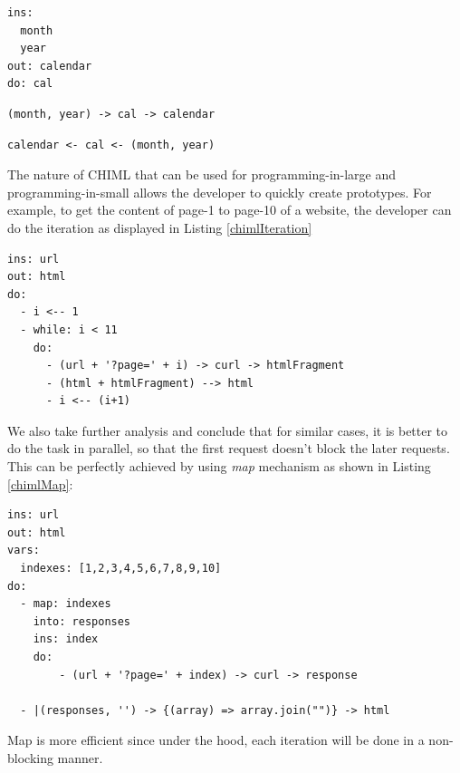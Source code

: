 \documentclass[conference]{IEEEtran}
\begin{document}
\begin{lstlisting}[caption=CHIML Program Example, label=chimlLongExample, basicstyle=\footnotesize, breaklines=true]
ins:
  month
  year
out: calendar
do: cal
\end{lstlisting}

\begin{lstlisting}[caption=CHIML Program Example (Short), label=chimlShortExample, basicstyle=\footnotesize, breaklines=true]
(month, year) -> cal -> calendar
\end{lstlisting}

\begin{lstlisting}[caption=CHIML Program Example (Short-Reversed), label=chimlReversedExample, basicstyle=\footnotesize, breaklines=true]
calendar <- cal <- (month, year)
\end{lstlisting}

The nature of CHIML that can be used for programming-in-large and programming-in-small allows the developer to quickly create prototypes. For example, to get the content of page-1 to page-10 of a website, the developer can do the iteration as displayed in Listing \ref{chimlIteration}

\begin{lstlisting}[caption=CHIML Iteration, label=chimlIteration, basicstyle=\footnotesize, breaklines=true]
ins: url
out: html
do:
  - i <-- 1
  - while: i < 11
    do:
      - (url + '?page=' + i) -> curl -> htmlFragment
      - (html + htmlFragment) --> html
      - i <-- (i+1)
\end{lstlisting}

We also take further analysis and conclude that for similar cases, it is better to do the task in parallel, so that the first request doesn't block the later requests. This can be perfectly achieved by using {\it map} mechanism as shown in Listing \ref{chimlMap}:

\begin{lstlisting}[caption=CHIML Map Feature, label=chimlMap, basicstyle=\footnotesize, breaklines=true]
ins: url
out: html
vars:
  indexes: [1,2,3,4,5,6,7,8,9,10]
do:
  - map: indexes
    into: responses
    ins: index
    do: 
        - (url + '?page=' + index) -> curl -> response

  - |(responses, '') -> {(array) => array.join("")} -> html
\end{lstlisting}

Map is more efficient since under the hood, each iteration will be done in a non-blocking manner.
\end{document}
